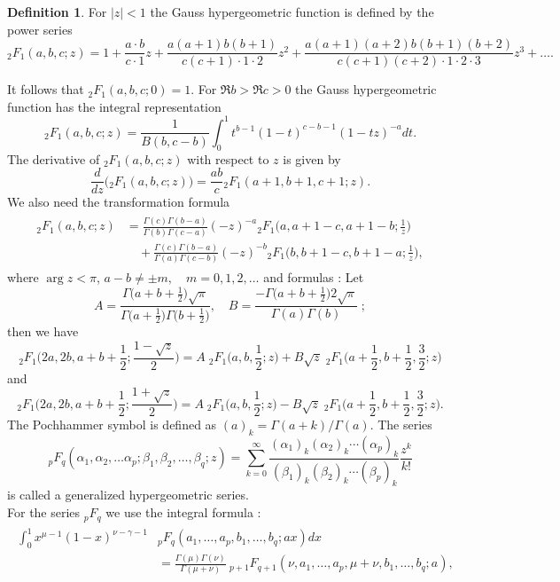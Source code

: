 \documentclass[a4paper,11pt]{amsart}
\theoremstyle{definition}
\newtheorem{defn}[theorem]{Definition}
\begin{document}
\begin{defn}
For $|z|<1$ the Gauss hypergeometric function is defined by the power series 
$${}_2F_1(a,b,c;z)=1+\frac{a\cdot b}{c \cdot 1}z+\frac{a(a+1)b(b+1)}{c(c+1)\cdot 1 \cdot 2}z^2+\frac{a(a+1)(a+2)b(b+1)(b+2)}{c(c+1)(c+2)\cdot 1 \cdot 2 \cdot 3}z^3+ \dots.$$
\end{defn}
It follows that ${}_2F_1(a,b,c;0)=1$.
For $\Re b>\Re c >0$ the Gauss hypergeometric function has the integral representation \cite[eq. 9.111]{gradshteyn2007}
$${}_2F_1(a,b,c;z)=\frac{1}{B(b,c-b)}\int_0^1t^{b-1}(1-t)^{c-b-1}(1-tz)^{-a}dt.$$
The derivative of ${}_2F_1(a,b,c;z)$ with respect to $z$ is given by
\begin{equation}\label{der}
\frac{d}{dz}\big({}_2F_1(a,b,c;z)\big)=\frac{ab}{c}{}_2F_1(a+1,b+1,c+1;z).\end{equation}
We also need the transformation formula \cite[eq. 9.132.2]{gradshteyn2007}
\begin{align}
\begin{split}
    {}_2F_1(a,b,c;z)&=\frac{\Gamma(c)\Gamma(b-a)}{\Gamma(b)\Gamma(c-a)}(-z)^{-a}{}_2F_1\Big(a,a+1-c,a+1-b;\frac{1}{z}\Big) \\
    &\quad+ \frac{\Gamma(c)\Gamma(b-a)}{\Gamma(a)\Gamma(c-b)}(-z)^{-b}{}_2F_1\Big(b,b+1-c,b+1-a;\frac{1}{z}\Big),
\end{split}
\end{align}
where $\arg z<\pi$,\: $a-b\neq \pm m,\quad m=0,1,2, \dots$
and formulas \cite[eq. 9.136.1--9.136.2]{gradshteyn2007}:
Let $$A=\frac{\Gamma\big(a+b+\frac{1}{2}\big)\sqrt{\pi}}{\Gamma\big(a+\frac{1}{2}\big)\Gamma\big(b+\frac{1}{2}\big)}, \quad B=\frac{-\Gamma\big(a+b+\frac{1}{2}\big)2\sqrt{\pi}}{\Gamma(a)\Gamma(b)}\;;$$ then we have
$${}_2F_1\Bigg(2a,2b,a+b+\frac{1}{2};\frac{1-\sqrt{z}}{2}\Bigg)=A\; {}_2F_1\big(a,b,\frac{1}{2};z\big)+B\sqrt{z}\; {}_2F_1\Bigg(a+\frac{1}{2},b+\frac{1}{2},\frac{3}{2};z\Bigg)$$
and
$${}_2F_1\Bigg(2a,2b,a+b+\frac{1}{2};\frac{1+\sqrt{z}}{2}\Bigg)=A\; {}_2F_1\big(a,b,\frac{1}{2};z\big)-B\sqrt{z}\; {}_2F_1\Bigg(a+\frac{1}{2},b+\frac{1}{2},\frac{3}{2};z\Bigg).$$
The Pochhammer symbol is defined as $(a)_k=\Gamma(a+k)/\Gamma(a)$. The series $${}_pF_q (\alpha_1, \alpha_2, \dots \alpha_p; \beta_1, \beta_2, \dots , \beta_q; z)=\sum_{k=0}^{\infty}\frac{(\alpha_1)_k(\alpha_2)_k \cdots (\alpha_p)_k}{(\beta_1)_k(\beta_2)_k \cdots (\beta_p)_k}\frac{z^k}{k!} $$
is called a generalized hypergeometric series.\\
For the series ${}_pF_q$ we use the integral formula \cite[eq. 7.512.12]{gradshteyn2007}:
\begin{align}
    \begin{split}
      \int_0^1x^{\mu-1}(1-x)^{\nu-\gamma-1}&{}_pF_q(a_1, \dots ,a_p,b_1, \dots ,b_q;ax)dx\\
      &=\frac{\Gamma(\mu)\Gamma(\nu)}{\Gamma(\mu+\nu)}\: _{p+1}F_{q+1}(\nu,a_1, \dots ,a_p,\mu+\nu,b_1, \dots ,b_q;a),
    \end{split}
\end{align}
\end{document}
